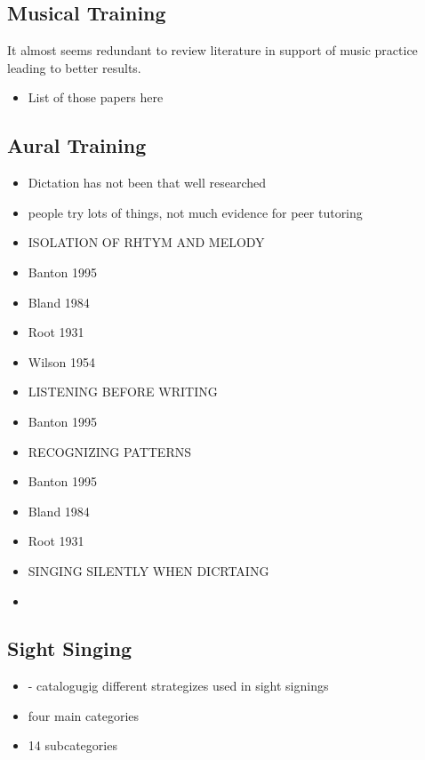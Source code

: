 \documentclass[]{book}
\providecommand{\tightlist}{%
  \setlength{\itemsep}{0pt}\setlength{\parskip}{0pt}}
\theoremstyle{definition}
\theoremstyle{definition}
\theoremstyle{definition}
\theoremstyle{remark}
\begin{document}
\hypertarget{musical-training}{%
\subsection{Musical Training}\label{musical-training}}

It almost seems redundant to review literature in support of music
practice leading to better results.

\begin{itemize}
\tightlist
\item
  List of those papers here
\end{itemize}

\hypertarget{aural-training}{%
\subsection{Aural Training}\label{aural-training}}

\begin{itemize}
\tightlist
\item
  Dictation has not been that well researched
  \citep{furbyEffectsPeerTutoring2016}
\item
  people try lots of things, not much evidence for peer tutoring
  \citep{furbyEffectsPeerTutoring2016}
\item
  ISOLATION OF RHTYM AND MELODY
\item
  Banton 1995
\item
  Bland 1984
\item
  Root 1931
\item
  Wilson 1954
\item
  LISTENING BEFORE WRITING
\item
  Banton 1995
\item
  RECOGNIZING PATTERNS
\item
  Banton 1995
\item
  Bland 1984
\item
  Root 1931
\item
  SINGING SILENTLY WHEN DICRTAING
\item
  \citep{klonoskiImprovingDictationAuralSkills2006}
\end{itemize}

\hypertarget{sight-singing}{%
\subsection{Sight Singing}\label{sight-singing}}

\begin{itemize}
\tightlist
\item
  \citep{fournierCognitiveStrategiesSightsinging2017a} - catalogugig
  different strategizes used in sight signings
\item
  four main categories
\item
  14 subcategories
\end{itemize}
\end{document}
